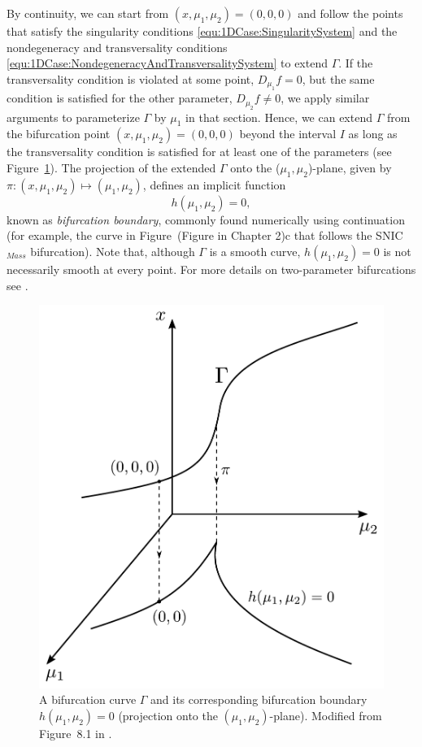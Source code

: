 \documentclass[12pt]{article}
\begin{document}
By continuity, we can start from $(x,\mu_{1},\mu_{2})=(0,0,0)$ and follow the points that satisfy the singularity conditions \eqref{equ:1DCase:SingularitySystem} and the nondegeneracy and transversality conditions \eqref{equ:1DCase:NondegeneracyAndTransversalitySystem} to extend $\Gamma$. If the transversality condition is violated at some point, $D_{\mu_{1}}f=0$, but the same condition is satisfied for the other parameter, $D_{\mu_{2}}f\neq0$, we apply similar arguments to parameterize $\Gamma$ by $\mu_{1}$ in that section. Hence, we can extend $\Gamma$ from the bifurcation point $(x,\mu_{1},\mu_{2})=(0,0,0)$ beyond the interval $I$ as long as the transversality condition is satisfied for at least one of the parameters (see Figure~\ref{fig:G2ModuleMass:BifurcationCurveGamma}). The projection of the extended $\Gamma$ onto the ($\mu_{1},\mu_{2}$)-plane, given by $\pi:(x,\mu_{1},\mu_{2})\mapsto(\mu_{1},\mu_{2})$, defines an implicit function
\[h(\mu_{1},\mu_{2})=0, \]
known as \textit{bifurcation boundary}, commonly found numerically using continuation (for example, the curve in Figure~(Figure in Chapter 2)c that follows the SNIC$_{Mass}$ bifurcation). Note that, although $\Gamma$ is a smooth curve, $h(\mu_{1},\mu_{2})=0$ is not necessarily smooth at every point. For more details on two-parameter bifurcations see \citet{Kuznetsov2004}.

\begin{figure}
    \begin{center}
    \includegraphics[width=0.50\linewidth]{figures/BifurcationCurveGamma.pdf}
    \end{center}
    \caption{A bifurcation curve $\Gamma$ and its corresponding bifurcation boundary $h(\mu_{1},\mu_{2})=0$ (projection onto the $(\mu_{1},\mu_{2})$-plane). Modified from Figure~8.1 in \citet{Kuznetsov2004}.}
    \label{fig:G2ModuleMass:BifurcationCurveGamma}
\end{figure}
\end{document}
